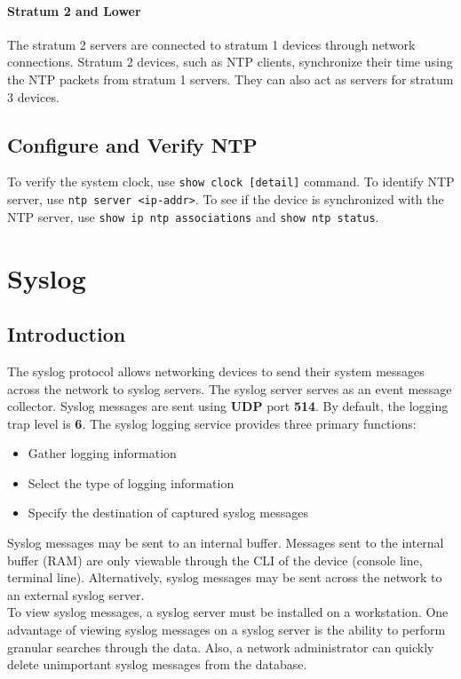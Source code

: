 \paragraph{Stratum 2 and Lower}The stratum 2 servers are connected to stratum 1 devices through network connections. Stratum 2 devices, such as NTP clients, synchronize their time using the NTP packets from stratum 1 servers. They can also act as servers for stratum 3 devices.

\subsection{Configure and Verify NTP}

To verify the system clock, use \verb|show clock [detail]| command. To identify NTP server, use \verb|ntp server <ip-addr>|. To see if the device is synchronized with the NTP server, use \verb|show ip ntp associations| and \verb|show ntp status|.

\section{Syslog}

\subsection{Introduction}

The syslog protocol allows networking devices to send their system messages across the network to syslog servers. The syslog server serves as an event message collector. Syslog messages are sent using \textbf{UDP} port \textbf{514}. By default, the logging trap level is \textbf{6}. The syslog logging service provides three primary functions:

\begin{itemize}
\item Gather logging information
\item Select the type of logging information
\item Specify the destination of captured syslog messages
\end{itemize}

Syslog messages may be sent to an internal buffer. Messages sent to the internal buffer (RAM) are only viewable through the CLI of the device (console line, terminal line). Alternatively, syslog messages may be sent across the network to an external syslog server.\\

To view syslog messages, a syslog server must be installed on a workstation. One advantage of viewing syslog messages on a syslog server is the ability to perform granular searches through the data. Also, a network administrator can quickly delete unimportant syslog messages from the database.

